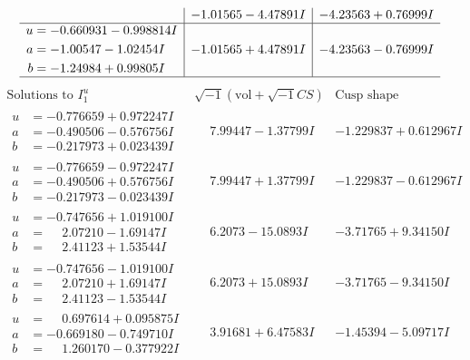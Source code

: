 \documentclass[1p]{elsarticle_modified}
\theoremstyle{definition}
\newcommand{\I}{\sqrt{-1}}
\begin{document}
$$\begin{array}{c|c|c}
 & -1.01565 - 4.47891 I & -4.23563 + 0.76999 I \\ \hline\begin{aligned}
u &= -0.660931 - 0.998814 I \\
a &= -1.00547 - 1.02454 I \\
b &= -1.24984 + 0.99805 I\end{aligned}
 & -1.01565 + 4.47891 I & -4.23563 - 0.76999 I\\
 \hline 
 \end{array}$$\newpage$$\begin{array}{c|c|c}  
\text{Solutions to }I^u_{1}& \I (\text{vol} + \sqrt{-1}CS) & \text{Cusp shape}\\
 \hline 
\begin{aligned}
u &= -0.776659 + 0.972247 I \\
a &= -0.490506 - 0.576756 I \\
b &= -0.217973 + 0.023439 I\end{aligned}
 & \phantom{-}7.99447 - 1.37799 I & -1.229837 + 0.612967 I \\ \hline\begin{aligned}
u &= -0.776659 - 0.972247 I \\
a &= -0.490506 + 0.576756 I \\
b &= -0.217973 - 0.023439 I\end{aligned}
 & \phantom{-}7.99447 + 1.37799 I & -1.229837 - 0.612967 I \\ \hline\begin{aligned}
u &= -0.747656 + 1.019100 I \\
a &= \phantom{-}2.07210 - 1.69147 I \\
b &= \phantom{-}2.41123 + 1.53544 I\end{aligned}
 & \phantom{-}6.2073 - 15.0893 I & -3.71765 + 9.34150 I \\ \hline\begin{aligned}
u &= -0.747656 - 1.019100 I \\
a &= \phantom{-}2.07210 + 1.69147 I \\
b &= \phantom{-}2.41123 - 1.53544 I\end{aligned}
 & \phantom{-}6.2073 + 15.0893 I & -3.71765 - 9.34150 I \\ \hline\begin{aligned}
u &= \phantom{-}0.697614 + 0.095875 I \\
a &= -0.669180 - 0.749710 I \\
b &= \phantom{-}1.260170 - 0.377922 I\end{aligned}
 & \phantom{-}3.91681 + 6.47583 I & -1.45394 - 5.09717 I \\ \hline\begin{aligned}

\end{aligned}
\end{array}$$
\end{document}
